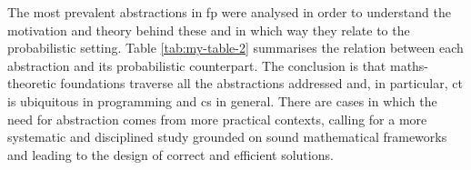 \documentclass[
  oneside,
  11pt, a4paper,
  footinclude=true,
  headinclude=true,
  cleardoublepage=empty
]{scrbook}
\theoremstyle{definition}
\theoremstyle{definition}
\begin{document}
\begin{table}%
\centering
{}
\caption{Summary of abstractions and their probabilistic counterpart}
\label{tab:my-table-2}
\end{table}

    The most prevalent abstractions in \gls{fp} were analysed in order to understand the motivation and theory behind these and in which way they relate to the probabilistic setting. Table \ref{tab:my-table-2} summarises the relation between each abstraction and its probabilistic counterpart. The conclusion is that maths-theoretic foundations traverse all the abstractions addressed and, in particular, \gls{ct} is ubiquitous in programming and \gls{cs} in general. There are cases in which the need for abstraction comes from more practical contexts, calling for a more systematic and disciplined study grounded on sound mathematical frameworks and leading to the design of correct and efficient solutions.
    
\end{document}
